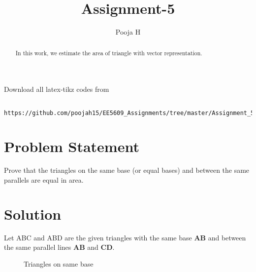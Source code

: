 \documentclass[journal,12pt,twocolumn]{IEEEtran}
\begin{document}
	\makeatother
	\let\StandardTheFigure\thefigure
	\let\vec\mathbf
	\renewcommand{\thefigure}{\theproblem}
	\def\putbox#1#2#3{\makebox[0in][l]{\makebox[#1][l]{}\raisebox{\baselineskip}[0in][0in]{\raisebox{#2}[0in][0in]{#3}}}}
	\def\rightbox#1{\makebox[0in][r]{#1}}
	\def\centbox#1{\makebox[0in]{#1}}
	\def\topbox#1{\raisebox{-\baselineskip}[0in][0in]{#1}}
	\def\midbox#1{\raisebox{-0.5\baselineskip}[0in][0in]{#1}}
	\vspace{3cm}
	\title{Assignment-5}
	\author{Pooja H \\ }
	\maketitle
	\newpage
	\bigskip
	\renewcommand{\thefigure}{\theenumi}
	\renewcommand{\thetable}{\theenumi}
\begin{abstract}
	In this work, we estimate the area of triangle with vector representation.
\end{abstract}
Download all latex-tikz codes from 
\begin{lstlisting}
	https://github.com/poojah15/EE5609_Assignments/tree/master/Assignment_5
\end{lstlisting}
\section{Problem Statement}
Prove that the triangles on the same base (or equal bases) and between the same parallels are equal in area.
\section{Solution}
Let ABC and ABD are the given triangles with the same base $\vec{AB}$ and between the same parallel lines $\vec{AB}$ and $\vec{CD}$.
\renewcommand{\thefigure}{1}
\begin{figure}[!ht] \label{fig:two_triangles}
\centering
\resizebox{\columnwidth}{!}{}
\caption{Triangles on same base}
\end{figure}
\end{document}
